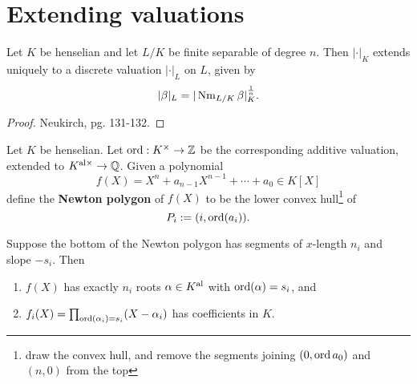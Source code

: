 \section{Extending valuations}
\begin{thm}
Let $K$ be henselian %
and let $L/K$ be finite separable of degree $n$. Then $|\cdot|_K$ extends uniquely to a discrete valuation $|\cdot|_L$ on $L$, given by
\[
|\beta|_L=|\operatorname{Nm}_{L/K}\beta|_K^{\frac{1}{n}}.
\]
\end{thm}
\begin{proof}
Neukirch, pg. 131-132.
\end{proof}
\begin{df}
Let $K$ be henselian. Let $\operatorname{ord}:K^{\times}\to \mathbb{Z}$ be the corresponding additive valuation, extended to $K^{\text{al}\times}\to \mathbb{Q}$. Given a polynomial
\[
f(X)=X^n+a_{n-1}X^{n-1}+\cdots +a_0\in K[X]
\]
define the \textbf{Newton polygon} of $f(X)$ to be the lower convex hull\footnote{draw the convex hull, and remove the segments joining $(0,\operatorname{ord} a_0)$ and $(n,0)$ from the top}
 of
\[
P_i:=(i,\operatorname{ord}(a_{i})).
\]
\end{df}
\begin{pr}
Suppose the bottom of the Newton polygon has segments of $x$-length $n_i$ and slope $-s_i$. Then 
\begin{enumerate}
\item $f(X)$ has exactly $n_i$ roots $\alpha\in K^{\text{al}}$ with $\operatorname{ord}(\alpha)=s_i$, and
\item $f_i(X)=\prod_{\operatorname{ord}(\alpha_i)=s_i} (X-\alpha_i)$ has coefficients in $K$.
\end{enumerate}
\end{pr}
